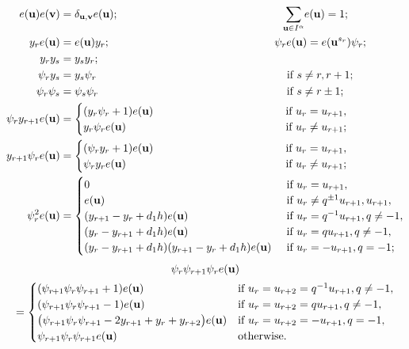 \documentclass[ALCO,ThmDefs,Unicode,epreuves]{cedram}
\newcommand{\Bv}{\mathbf{v}}
\newcommand{\Bu}{\mathbf{u}}
\newcommand*{\Mk}{\mkern -2mu}
\begin{document}
\begin{align*}
e(\Bu) e(\Bv) &= \delta_{\Bu,\Bv} e(\Bu);
\hspace{53mm}{\sum_{\Bu \in I^\alpha}} e(\Bu) = 1;\\
y_r e(\Bu) &= e(\Bu) y_r;
\hspace{53mm}\psi_r e(\Bu) = e(\Bu^{s_r}) \psi_r;\\
y_r y_s &= y_s y_r;\\
\psi_r y_s &= y_s \psi_r\hspace{61.4mm}\text{if $s \neq r,r+1$};\\
\psi_r \psi_s &= \psi_s \psi_r\hspace{60.8mm}\text{if $s\neq r\pm 1$};\\
\psi_r y_{r+1} e(\Bu) 
&= 
\begin{cases}
 (y_r\psi_r+1)e(\Bu) &\hbox{if $u_r=u_{r+1}$},\\
 y_r\psi_r e(\Bu) \hspace{48mm}&\hbox{if $u_r\neq u_{r+1}$};
\end{cases}\\
y_{r+1} \psi_re(\Bu) &=
\begin{cases}
 (\psi_r y_r+1) e(\Bu)
 &\hbox{if $u_r=u_{r+1}$},\\
 \psi_r y_r e(\Bu) \hspace{48mm}&\hbox{if $u_r\neq u_{r+1}$};\\
\end{cases}\\
\psi_r^2e(\Bu) &=
\begin{cases}
0 \hspace{60mm}&\text{if $u_r = u_{r+1}$},\\
e(\Bu)&\text{if $u_r \neq q^{\pm 1}u_{r+1},u_{r+1}$},\\
(y_{r+1}-y_r+d_1h)e(\Bu)&\text{if $u_r = q^{-1}u_{r+1}, q\neq -1$},\\
(y_r - y_{r+1}+d_1h)e(\Bu)&\text{if $u_r = qu_{r+1}, q\neq -1$},\\
(y_r - y_{r+1}+d_1h)(y_{r+1} - y_{r}+d_1h) e(\Bu)&\text{if $u_r=-u_{r+1}, q=-1$};
\end{cases}
\end{align*}\begin{multline*}
\psi_{r}\psi_{r + 1} \psi_{r} e(\Bu)
\\
=
\begin{cases}
 (\psi_{r\Mk+ 1} \psi_{r} \psi_{r + 1}  + 1)e(\Bu)& \text{if $u_r  =  u_{r + 2} = q^{-1}u_{r + 1}, q \neq  -1$},\\
 (\psi_{r+1} \psi_{r} \psi_{r+1} -1)e(\Bu)& \text{if $u_r = u_{r+2}=qu_{r+1}, q\neq -1$},\\
 \big(\psi_{r+1} \psi_{r} \psi_{r+1} -2y_{r+1} +y_r+y_{r+2}\big)e(\Bu)
& \text{if $u_r = u_{r+2}=-u_{r+1}, q= -1$},\\
 \psi_{r+1} \psi_{r} \psi_{r+1} e(\Bu)& \text{otherwise}.
\end{cases}
\end{multline*}
\end{document}

